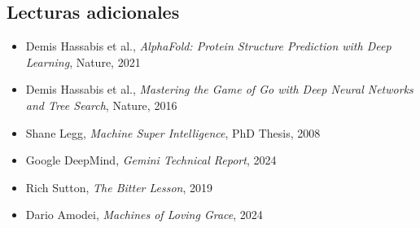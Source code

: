 \subsection{Lecturas adicionales}

\begin{itemize}
    \item Demis Hassabis et al., \textit{AlphaFold: Protein Structure Prediction with Deep Learning}, Nature, 2021
    \item Demis Hassabis et al., \textit{Mastering the Game of Go with Deep Neural Networks and Tree Search}, Nature, 2016
    \item Shane Legg, \textit{Machine Super Intelligence}, PhD Thesis, 2008
    \item Google DeepMind, \textit{Gemini Technical Report}, 2024
    \item Rich Sutton, \textit{The Bitter Lesson}, 2019
    \item Dario Amodei, \textit{Machines of Loving Grace}, 2024
\end{itemize}


